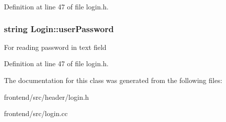 Definition at line 47 of file login.\-h.

\hypertarget{classLogin_a9731be126468f535f161f045c95687c6}{
\subsubsection[{user\-Password}]{\setlength{\rightskip}{0pt plus 5cm}string Login\-::user\-Password\hspace{0.3cm}{\ttfamily [protected]}}}\label{classLogin_a9731be126468f535f161f045c95687c6}
For reading password in text field 

Definition at line 47 of file login.\-h.



The documentation for this class was generated from the following files\-:\begin{DoxyCompactItemize}
\item 
frontend/src/header/login.\-h\item 
frontend/src/login.\-cc\end{DoxyCompactItemize}

